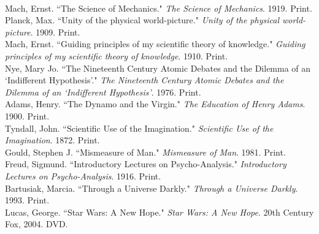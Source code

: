 \documentclass[11pt, oneside]{article}
\begin{document}
\begin{workscited}
\bibent \\
\bibent Mach, Ernst. ``The Science of Mechanics."  \textit{The Science of Mechanics}.  1919. Print. \\
\bibent Planck, Max. ``Unity of the physical world-picture."  \textit{Unity of the physical world-picture}.  1909. Print. \\
\bibent Mach, Ernst. ``Guiding principles of my scientific theory of knowledge."  \textit{Guiding principles of my scientific theory of knowledge}.  1910. Print. \\
\bibent Nye, Mary Jo. ``The Nineteenth Century Atomic Debates and the Dilemma of an `Indifferent Hypothesis'."  \textit{The Nineteenth Century Atomic Debates and the Dilemma of an `Indifferent Hypothesis'}.  1976. Print. \\
\bibent Adams, Henry.  ``The Dynamo and the Virgin."  \textit{The Education of Henry Adams}.  1900. Print. \\
\bibent Tyndall, John.  ``Scientific Use of the Imagination."  \textit{Scientific Use of the Imagination}.  1872. Print. \\
\bibent Gould, Stephen J.  ``Mismeasure of Man."  \textit{Mismeasure of Man}.  1981. Print. \\
\bibent Freud, Sigmund.  ``Introductory Lectures on Psycho-Analysis."  \textit{Introductory Lectures on Psycho-Analysis}.  1916. Print. \\
\bibent Bartusiak, Marcia.  ``Through a Universe Darkly."  \textit{Through a Universe Darkly}.  1993. Print. \\
\bibent Lucas, George. ``Star Wars: A New Hope."   \textit{Star Wars: A New Hope}. 20th Century Fox, 2004. DVD.
\end{workscited}
\end{document}
